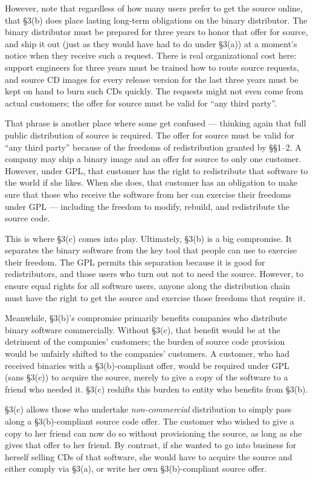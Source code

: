 \documentclass[12pt]{report}
\begin{document}
However, note that regardless of how many users prefer to get the source
online, that \S 3(b) does place lasting long-term obligations on the
binary distributor.  The binary distributor must be prepared for three
years to honor that offer for source, and ship it out (just as they would
have had to do under \S 3(a)) at a moment's notice when they receive such
a request.  There is real organizational cost here: support engineers for
three years must be trained how to route source requests, and source CD
images for every release version for the last three years must be kept on
hand to burn such CDs quickly.  The requests might not even come from
actual customers; the offer for source must be valid for ``any third
party''.

That phrase is another place where some get confused --- thinking again
that full public distribution of source is required.  The offer for source
must be valid for ``any third party'' because of the freedoms of
redistribution granted by \S\S 1--2.  A company may ship a binary image
and an offer for source to only one customer.  However, under GPL, that
customer has the right to redistribute that software to the world if she
likes.  When she does, that customer has an obligation to make sure that
those who receive the software from her can exercise their freedoms under
GPL --- including the freedom to modify, rebuild, and redistribute the
source code.

This is where \S 3(c) comes into play.  Ultimately, \S 3(b) is a big
compromise.  It separates the binary software from the key tool that
people can use to exercise their freedom.  The GPL permits this separation
because it is good for redistributors, and those users who turn out not to
need the source.  However, to ensure equal rights for all software users,
anyone along the distribution chain must have the right to get the source
and exercise those freedoms that require it.

Meanwhile, \S 3(b)'s compromise primarily benefits companies who
distribute binary software commercially.  Without \S 3(c), that benefit
would be at the detriment of the companies' customers; the burden of
source code provision would be unfairly shifted to the companies'
customers.  A customer, who had received binaries with a \S 3(b)-compliant
offer, would be required under GPL (sans \S 3(c)) to acquire the source,
merely to give a copy of the software to a friend who needed it.  \S 3(c)
reshifts this burden to entity who benefits from \S 3(b).

\S 3(c) allows those who undertake \emph{non-commercial} distribution to
simply pass along a \S 3(b)-compliant source code offer.  The customer who
wished to give a copy to her friend can now do so without provisioning the
source, as long as she gives that offer to her friend.  By contrast, if
she wanted to go into business for herself selling CDs of that software,
she would have to acquire the source and either comply via \S 3(a), or
write her own \S 3(b)-compliant source offer.
\end{document}
